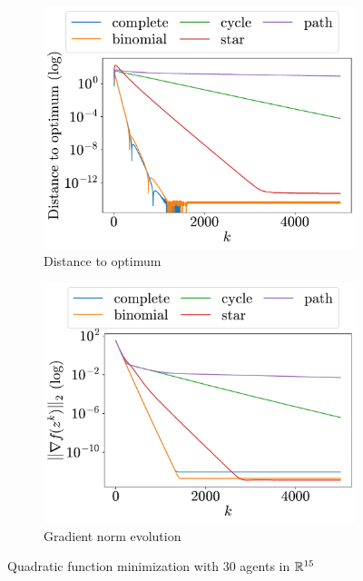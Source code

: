 \documentclass[a4paper,11pt,oneside]{book}
\begin{document}
\begin{figure}[H]
      \centering
      \begin{subfigure}[t]{0.46\linewidth}
            \centering
            \includegraphics[width=\linewidth]{./figs/quadratic/30_15/distance.pdf} 
            \caption{Distance to optimum}
      \end{subfigure}
      \hfill
      \begin{subfigure}[t]{0.46\linewidth}
            \centering
            \includegraphics[width=\linewidth]{./figs/quadratic/30_15/gradient.pdf} 
            \caption{Gradient norm evolution}
      \end{subfigure}
      \caption{Quadratic function minimization with $30$ agents in ${\mathbb{R}}^{15}$}
      \label{fig:quadratic_30_15}
\end{figure}
\end{document}
